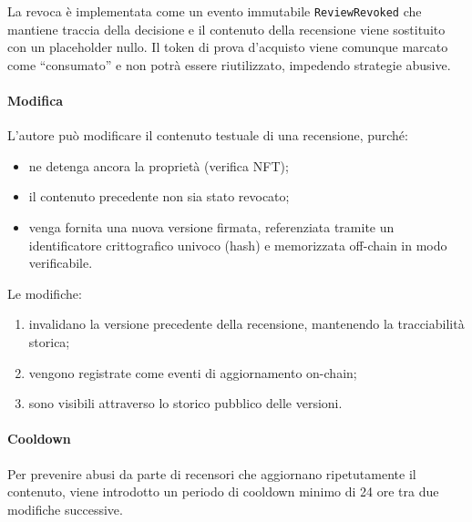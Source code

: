                     \noindent La revoca è implementata come un evento immutabile \texttt{ReviewRevoked} che mantiene traccia della decisione e il contenuto della recensione viene sostituito con un placeholder nullo. Il token di prova d'acquisto viene comunque marcato come “consumato” e non potrà essere riutilizzato, impedendo strategie abusive.
                
                \paragraph{Modifica}
                    L'autore può modificare il contenuto testuale di una recensione, purché:
                        \begin{itemize}
                            \item ne detenga ancora la proprietà (verifica NFT);
                            
                            \item il contenuto precedente non sia stato revocato;
                            
                            \item venga fornita una nuova versione firmata, referenziata tramite un identificatore crittografico univoco (hash) e memorizzata off-chain in modo verificabile.
                        \end{itemize}
                    
                    \noindent Le modifiche:
                        \begin{enumerate}
                            \item invalidano la versione precedente della recensione, mantenendo la tracciabilità storica;
                            
                            \item vengono registrate come eventi di aggiornamento on-chain;
                            
                            \item sono visibili attraverso lo storico pubblico delle versioni.
                        \end{enumerate}
                
                \paragraph{Cooldown}
                    Per prevenire abusi da parte di recensori che aggiornano ripetutamente il contenuto, viene introdotto un periodo di cooldown minimo di 24 ore tra due modifiche successive.
                                
